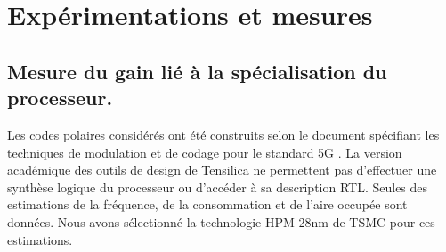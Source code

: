 \section{Expérimentations et mesures}
\label{sec:tensilica_res}

\subsection{Mesure du gain lié à la spécialisation du processeur.}

Les codes polaires considérés ont été construits selon le document spécifiant les techniques de modulation et de codage pour le standard 5G \cite{3gpp_ts_2017-1}. 
La version académique des outils de design de Tensilica ne permettent pas d'effectuer une synthèse logique du processeur ou d'accéder à sa description RTL. Seules des estimations de la fréquence, de la consommation et de l'aire occupée sont données. Nous avons sélectionné la technologie HPM 28nm de TSMC pour ces estimations.

